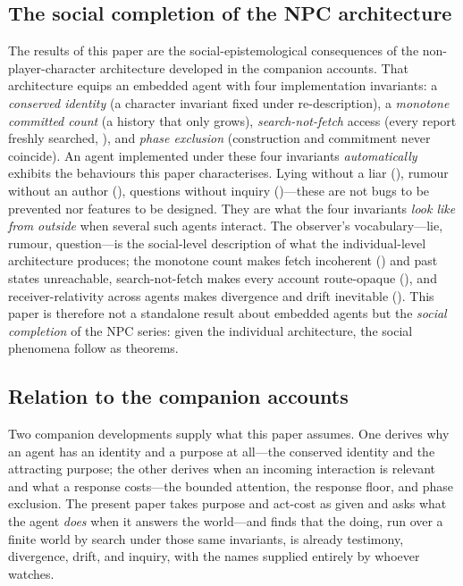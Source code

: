 \documentclass[11pt,twocolumn,a4paper]{article}
\begin{document}
\subsection{The social completion of the NPC architecture}
\label{sec:npc}

The results of this paper are the social-epistemological consequences of the
non-player-character architecture developed in the companion accounts. That
architecture equips an embedded agent with four implementation
invariants: a \emph{conserved identity} (a character invariant fixed under
re-description), a \emph{monotone committed count} (a history that only
grows), \emph{search-not-fetch} access (every report freshly searched,
), and \emph{phase exclusion}
(construction and commitment never coincide). An agent implemented under
these four invariants \emph{automatically} exhibits the behaviours this
paper characterises. Lying without a liar (), rumour
without an author (), questions without inquiry
()---these are not bugs to be prevented nor features to be
designed. They are what the four invariants \emph{look like from outside}
when several such agents interact. The observer's vocabulary---lie, rumour,
question---is the social-level description of what the individual-level
architecture produces; the monotone count makes fetch incoherent
() and past states unreachable, search-not-fetch
makes every account route-opaque (), and
receiver-relativity across agents makes divergence and drift inevitable
(). This paper is therefore not a standalone
result about embedded agents but the \emph{social completion} of the NPC
series: given the individual architecture, the social phenomena follow as
theorems.

\subsection{Relation to the companion accounts}

Two companion developments supply what this paper assumes. One derives why an
agent has an identity and a purpose at all---the conserved identity and the
attracting purpose; the other derives when an incoming interaction is
relevant and what a response costs---the bounded attention, the response
floor, and phase exclusion. The present paper takes purpose and act-cost as
given and asks what the agent \emph{does} when it answers the world---and
finds that the doing, run over a finite world by search under those same
invariants, is already testimony, divergence, drift, and inquiry, with the
names supplied entirely by whoever watches.
\end{document}
